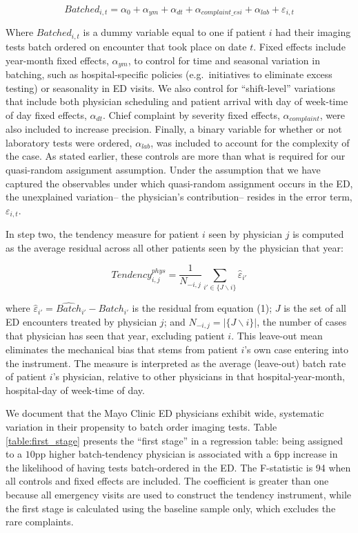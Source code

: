 \documentclass{article}
\begin{document}
\begin{equation}
Batched_{i,t} = \alpha_0 + \alpha_{ym} + \alpha_{dt} + \alpha_{complaint\_esi} + \alpha_{lab} + \varepsilon_{i,t}
\end{equation}

Where \(Batched_{i,t}\) is a dummy variable equal to one if patient
\(i\) had their imaging tests batch ordered on encounter that took place
on date \(t\). Fixed effects include year-month fixed effects,
\(\alpha_{ym}\), to control for time and seasonal variation in batching,
such as hospital-specific policies (e.g.~initiatives to eliminate excess
testing) or seasonality in ED visits. We also control for
``shift-level'' variations that include both physician scheduling and
patient arrival with day of week-time of day fixed effects,
\(\alpha_{dt}\). Chief complaint by severity fixed effects,
\(\alpha_{complaint}\), were also included to increase precision.
Finally, a binary variable for whether or not laboratory tests were
ordered, \(\alpha_{lab}\), was included to account for the complexity of
the case. As stated earlier, these controls are more than what is
required for our quasi-random assignment assumption. Under the
assumption that we have captured the observables under which
quasi-random assignment occurs in the ED, the unexplained variation--
the physician's contribution-- resides in the error term,
\(\varepsilon_{i,t}\).

In step two, the tendency measure for patient \(i\) seen by physician
\(j\) is computed as the average residual across all other patients seen
by the physician that year:

\begin{equation}
Tendency_{i,j}^{phys} =
\frac{1}{N_{-i,j}} \sum_{i' \in \{J \backslash i\}}\hat{\varepsilon}_{i'}
\end{equation}

where \(\hat{\varepsilon}_{i'} = \hat{Batch}_{i'} - Batch_{i'}\) is the
residual from equation (1); \(J\) is the set of all ED encounters
treated by physician \(j\); and \(N_{-i,j} = |\{J \backslash i\}|\), the
number of cases that physician has seen that year, excluding patient
\(i\). This leave-out mean eliminates the mechanical bias that stems
from patient \(i\)'s own case entering into the instrument. The measure
is interpreted as the average (leave-out) batch rate of patient \(i\)'s
physician, relative to other physicians in that hospital-year-month,
hospital-day of week-time of day.

We document that the Mayo Clinic ED physicians exhibit wide, systematic
variation in their propensity to batch order imaging tests. Table
\ref{table:first_stage} presents the ``first stage'' in a regression
table: being assigned to a \(10\)pp higher batch-tendency physician is
associated with a \(6\)pp increase in the likelihood of having tests
batch-ordered in the ED. The F-statistic is 94 when all controls and
fixed effects are included. The coefficient is greater than one because
all emergency visits are used to construct the tendency instrument,
while the first stage is calculated using the baseline sample only,
which excludes the rare complaints.
\end{document}
